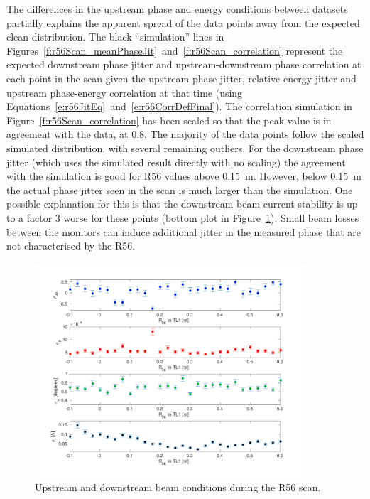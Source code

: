 The differences in the upstream phase and energy conditions between datasets partially explains the apparent spread of the data points away from the expected clean distribution. The black ``simulation'' lines in Figures~\ref{f:r56Scan_meanPhaseJit}~and~\ref{f:r56Scan_correlation} represent the expected downstream phase jitter and upstream-downstream phase correlation at each point in the scan given the upstream phase jitter, relative energy jitter and upstream phase-energy correlation at that time (using Equations~\ref{e:r56JitEq}~and~\ref{e:r56CorrDefFinal}). The correlation simulation in Figure~\ref{f:r56Scan_correlation} has been scaled so that the peak value is in agreement with the data, at 0.8. The majority of the data points follow the scaled simulated distribution, with several remaining outliers. For the downstream phase jitter (which uses the simulated result directly with no scaling) the agreement with the simulation is good for R56 values above 0.15~m. However, below 0.15~m the actual phase jitter seen in the scan is much larger than the simulation. One possible explanation for this is that the downstream beam current stability is up to a factor 3 worse for these points (bottom plot in Figure~\ref{f:r56Scan_upstreamParams}). Small beam losses between the monitors can induce additional jitter in the measured phase that are not characterised by the R56.

\begin{figure}
  \centering
  \includegraphics[width=0.9\textwidth]{Figures/propagation/r56Scan_upstreamParams}
  \caption{Upstream and downstream beam conditions during the R56 scan.}
  \label{f:r56Scan_upstreamParams}
\end{figure}

